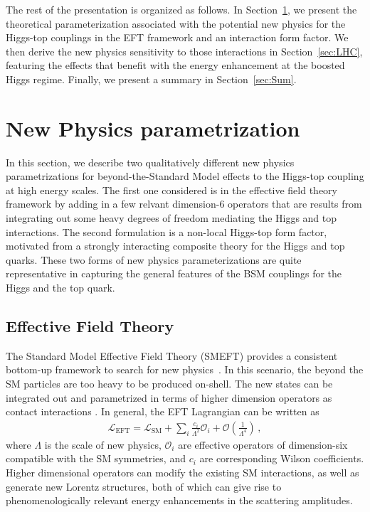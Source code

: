 \documentclass[reprint, aps,prd, preprintnumbers,groupedaddress,nofootinbib]{revtex4-1}
\begin{document}
The rest of the presentation is organized as follows. In Section~\ref{sec:BSM}, we present the theoretical parameterization associated with the potential new physics for the Higgs-top couplings in the EFT framework and an interaction form factor. We then derive the new physics sensitivity to those interactions in Section~\ref{sec:LHC}, featuring the effects that benefit with the energy enhancement at the boosted Higgs regime. Finally, we present a summary in Section~\ref{sec:Sum}.

\section{New Physics parametrization}
\label{sec:BSM}

In this section, we describe two qualitatively different new physics parametrizations for beyond-the-Standard Model effects to the Higgs-top coupling at high energy scales. The first one considered is in the effective field theory framework by adding in a few relvant dimension-6 operators that are results from integrating out some heavy  degrees of freedom mediating the Higgs and top interactions. The second formulation is a non-local Higgs-top form factor, motivated from a strongly interacting composite theory for the Higgs and top quarks. These two forms of new physics parameterizations are quite representative in capturing the general features of the BSM couplings for the Higgs and the top quark.


\subsection{Effective Field Theory}
\label{sec:eft}

The Standard Model Effective Field Theory (SMEFT) provides a consistent bottom-up framework to search for new physics~\cite{Buchmuller:1985jz,Grzadkowski:2010es,Ellis:2020unq,Ethier:2021bye,Brivio:2019ius,Corbett:2015ksa,Biekotter:2018jzu}. In this scenario, the beyond the SM particles are too heavy to be produced on-shell. The new states can be integrated out and parametrized in terms of higher dimension operators as contact interactions  \cite{Appelquist:1974tg}. In general, the EFT Lagrangian can be written as
\begin{align}
\mathcal{L}_{\text{EFT}} = \mathcal{L}_{\text{SM}} + \sum_{i} \frac{c_i}{\Lambda^2} \mathcal{O}_i + \mathcal{O}\left(\frac{1}{\Lambda^4}\right)\,,
\end{align}
where $\Lambda$ is the scale of new physics, $\mathcal{O}_i$ are effective operators of dimension-six compatible with the SM symmetries, and $c_i$ are corresponding  Wilson coefficients. 
Higher dimensional operators can modify the existing SM interactions, as well as generate new Lorentz structures, both of which can give rise to phenomenologically relevant  energy enhancements in the scattering amplitudes.
\end{document}
